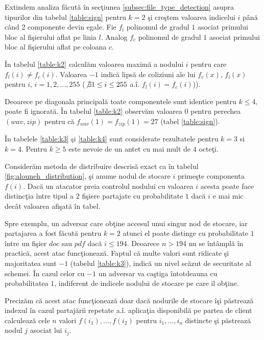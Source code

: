 \documentclass{llncs}
\begin{document}
Extindem analiza f\u{a}cut\u{a} \^{i}n sec\c{t}iunea {\ref{subsec:file_type_detection}} asupra tipurilor din tabelul {\ref{table:sign}} pentru $k = 2$ \c{s}i cre\c{s}tem valoarea indicelui $i$ p\^{a}n\u{a} c\^{a}nd 2 componente devin egale. Fie $f_l$ polinomul de gradul $1$ asociat primului bloc al fi\c{s}ierului aflat pe linia $l$. Analog $f_c$ polinomul de gradul $1$ asociat primului bloc al fi\c{s}ierului aflat pe coloana $c$.

\^{I}n tabelul {\ref{table:k2}} calcul\u{a}m valoarea maxim\u{a} a nodului $i$ pentru care $f_l(i) \neq f_c(i)$. Valoarea $-1$ indic\u{a} lips\u{a} de coliziuni ale lui $f_c(x)$, $f_l(x)$ pentru $i$, $i = {1,2,\dots,255}$ ($\not\exists 1 \leq i \leq 255$ a.\^{i}. $f_l(i) = f_c(i)$)).

Deoarece pe diagonala principal\u{a} toate componentele sunt identice pentru $k \leq 4$, poate fi ignorat\u{a}. \^{I}n tabelul {\ref{table:k2}} observ\u{a}m valoarea $0$ pentru perechea $(wav, zip)$ pentru c\u{a} $f_{wav}(1) = f_{zip}(1) = 27$ (tabel \ref{table:sign}).

\^{I}n tabelele {\ref{table:k3} \c{s}i \ref{table:k4}} sunt considerate rezultatele pentru $k = 3$ si $k = 4$. Pentru $k \geq 5$ este nevoie de un antet cu mai mult de $4$ octe\c{t}i.

Consider\u{a}m metoda de distribuire descris\u{a} exact ca \^{i}n tabelul {\ref{fig:alouneh_distribution}}, \c{s}i anume nodul de stocare $i$ prime\c{s}te componenta $f(i)$.
Dac\u{a} un atacator preia controlul nodului cu valoarea $i$ acesta poate face distinc\c{t}ia \^{i}ntre tipul a $2$ fi\c{s}iere partajate cu probabilitate $1$ dac\u{a} $i$ e mai mic dec\^{a}t valoarea afi\c{s}at\u{a} \^{i}n tabel.

Spre exemplu, un adversar care ob\c{t}ine accesul unui singur nod de stocare, iar partajarea a fost f\u{a}cut\u{a} pentru $k=2$ atunci el poate distinge cu probabilitate $1$ \^{i}ntre un fi\c{s}ier $doc$ sau $pdf$ dac\u{a} $i \leq 194$. Deoarece $n > 194$ nu se \^{i}nt\^{a}mpl\u{a} \^{i}n practic\u{a}, acest atac func\c{t}ioneaz\u{a}. Faptul c\u{a} multe valori sunt ridicate \c{s}i majoritatea sunt $-1$ (tabelul \ref{table:k3}), indic\u{a} un nivel sc\u{a}zut de securitate al schemei. \^{I}n cazul celor cu $-1$ un adversar va ca\c{s}tiga \^{i}ntotdeauna cu probabilitatea $1$, indiferent de indicele nodului de stocare pe care il ob\c{t}ine.

Preciz\u{a}m c\u{a} acest atac func\c{t}ioneaz\u{a} doar dac\u{a} nodurile de stocare \^{i}\c{s}i p\u{a}streaz\u{a} indexul \^{i}n cazul partaj\u{a}rii repetate a.\^{i}. aplica\c{t}ia disponibil\u{a} pe partea de client calculeaz\u{a} cele $n$ valori $f(i_1),\dots,f(i_2)$ pentru $i_1,\dots,i_n$ distincte \c{s}i p\u{a}streaz\u{a} nodul $j$ asociat lui $i_j$.
\end{document}
